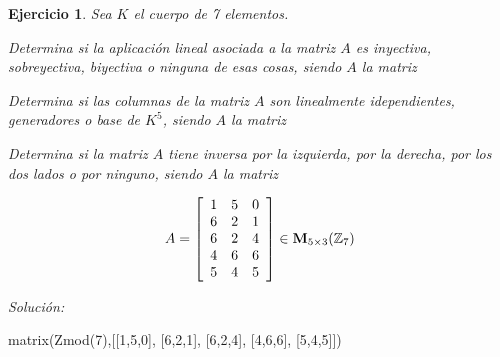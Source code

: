 \documentclass[12pt]{amsart}
\newtheorem{ejer}{Ejercicio}
\begin{document}
\begin{ejer} Sea $K$ el cuerpo de 7 elementos.
\newline
\noindent\begin{minipage}{\textwidth}
\begin{tcolorbox}[colback = green!20!white,title=Versión Aplicaciones]
Determina si la aplicaci\'on lineal asociada a la matriz $A$ es inyectiva, sobreyectiva, biyectiva o ninguna de esas cosas, siendo $A$ la matriz \end{tcolorbox}
\end{minipage} \newline
\noindent\begin{minipage}{\textwidth}
\begin{tcolorbox}[colback = blue!20!white,title=Versión Vectores]
Determina si las columnas de la matriz $A$ son linealmente idependientes, generadores o base de $K^{5}$, siendo $A$ la matriz \end{tcolorbox}
\end{minipage} \newline
\noindent\begin{minipage}{\textwidth} 
\begin{tcolorbox}[colback = red!20!white,title=Versión Inversas]
Determina si la matriz $A$ tiene inversa por la izquierda, por la derecha, por los dos lados o por ninguno, siendo $A$ la matriz 
\end{tcolorbox}
\end{minipage}
\[ A = \left[\begin{array}{rrr}
1 & 5 & 0 \\
6 & 2 & 1 \\
6 & 2 & 4 \\
4 & 6 & 6 \\
5 & 4 & 5
\end{array}\right] \in {\bf M}_{5\times 3}({\mathbb Z}_{7})\]
\end{ejer}

{\it Soluci\'on:}

\begin{sageblock}
matrix(Zmod(7),[[1,5,0],
[6,2,1],
[6,2,4],
[4,6,6],
[5,4,5]])
\end{sageblock}

\end{document}
